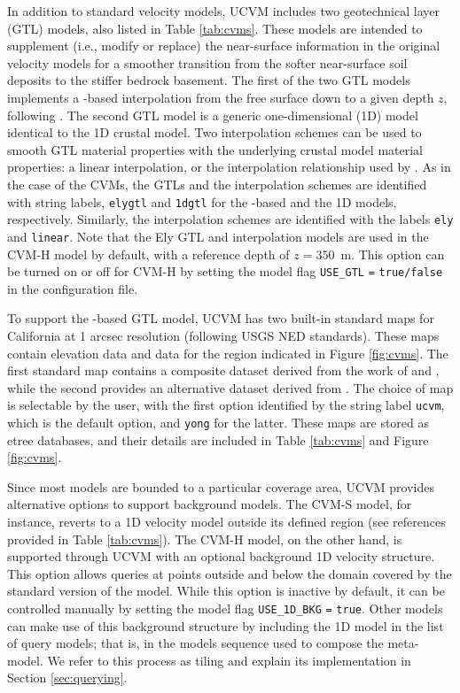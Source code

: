 In addition to standard velocity models, UCVM includes two geotechnical layer (GTL) models, also listed in Table \ref{tab:cvms}. These models are intended to supplement (i.e., modify or replace) the near-surface information in the original velocity models for a smoother transition from the softer near-surface soil deposits to the stiffer bedrock basement. The first of the two GTL models implements a \vsthirty-based interpolation from the free surface down to a given depth $z$, following \citet{Ely_2010_AGU}. The second GTL model is a generic one-dimensional (1D) model identical to the 1D crustal model. Two interpolation schemes can be used to smooth GTL material properties with the underlying crustal model material properties: a linear interpolation, or the interpolation relationship used by \citet{Ely_2010_AGU}. As in the case of the CVMs, the GTLs and the interpolation schemes are identified with string labels, \texttt{elygtl} and \texttt{1dgtl} for the \vsthirty-based and the 1D models, respectively. Similarly, the interpolation schemes are identified with the labels \texttt{ely} and \texttt{linear}. Note that the Ely GTL and interpolation models are used in the CVM-H model by default, with a reference depth of $z=350$~m. This option can be turned on or off for CVM-H by setting the model flag \texttt{USE\_GTL} \texttt{=} \texttt{true/false} in the configuration file.

To support the \vsthirty-based GTL model, UCVM has two built-in standard maps for California at 1 arcsec resolution (following USGS NED standards). These maps contain elevation data and \vsthirty{} data for the region indicated in Figure \ref{fig:cvms}. The first standard map contains a composite \vsthirty{} dataset derived from the work of \citet{Wills_2006_BSSA} and \citet{Wald_2007_BSSA}, while the second provides an alternative dataset derived from \citet{Yong_2012_BSSA}. The choice of map is selectable by the user, with the first option identified by the string label \texttt{ucvm}, which is the default option, and \texttt{yong} for the latter. These maps are stored as etree databases, and their details are included in Table \ref{tab:cvms} and Figure \ref{fig:cvms}.

Since most models are bounded to a particular coverage area, UCVM provides alternative options to support background models. The CVM-S model, for instance, reverts to a 1D velocity model outside its defined region (see references provided in Table \ref{tab:cvms}). The CVM-H model, on the other hand, is supported through UCVM with an optional background 1D velocity structure. This option allows queries at points outside and below the domain covered by the standard version of the model. While this option is inactive by default, it can be controlled manually by setting the model flag \texttt{USE\_1D\_BKG} \texttt{=} \texttt{true}. Other models can make use of this background structure by including the 1D model in the list of query models; that is, in the models sequence used to compose the meta-model. We refer to this process as tiling and explain its implementation in Section \ref{sec:querying}.

